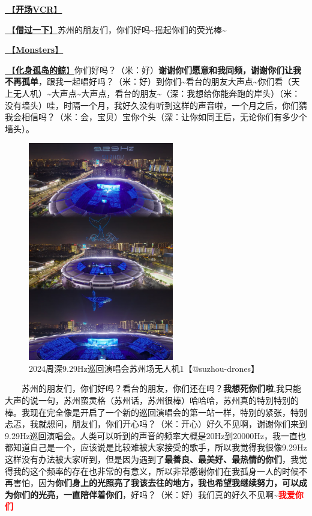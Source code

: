 \documentclass[]{ctexbook}
\begin{document}
\hyperref[opening-vcr]{🎥【\textbf{开场VCR}】}

\hyperref[I-will-go-my-way]{🎵【\textbf{借过一下}】}苏州的朋友们，你们好吗\textasciitilde 摇起你们的荧光棒\textasciitilde{}

\hyperref[Monsters]{🎵【\textbf{Monsters}】}

\hyperref[hua-shen-gu-dao-de-jing]{🎵【\textbf{化身孤岛的鲸}】}你们好吗？（米：好）\textbf{谢谢你们愿意和我同频，谢谢你们让我不再孤单}，跟我一起唱好吗？（米：好）到你们\textasciitilde 看台的朋友大声点\textasciitilde 你们看（天上无人机）\textasciitilde 大声点\textasciitilde 大声点，看台的朋友\textasciitilde（深：我想给你能奔跑的岸头）（米：没有墙头）哇，时隔一个月，我好久没有听到这样的声音啦，一个月之后，你们猜我会相信吗？（米：会，宝贝）宝你个头（深：让你如同王后，无论你们有多少个墙头）。

\begin{figure}

{\centering \includegraphics[width=180pt]{img/suzhou20241109/001} 

}

\caption{2024周深9.29Hz巡回演唱会苏州场无人机1【@suzhou-drones】}\label{fig:unnamed-chunk-114}
\end{figure}

  苏州的朋友们，你们好吗？看台的朋友，你们还在吗？\textbf{我想死你们啦},我只能大声的说一句，苏州蛮灵格（苏州话，苏州很棒）哈哈哈，苏州真的特别特别的棒。我现在完全像是开启了一个新的巡回演唱会的第一站一样，特别的紧张，特别忐忑，我就想问，朋友们，你们开心吗？（米：开心）好久不见啊，谢谢你们来到9.29Hz巡回演唱会。人类可以听到的声音的频率大概是20Hz到20000Hz，我一直也都知道自己是一个，应该说是比较难被大家接受的歌手，所以我觉得我很像9.29Hz这样没有办法被大家听到，但是因为遇到了\textbf{最善良、最美好、最热情的你们}，我觉得我的这个频率的存在也非常的有意义，所以非常感谢你们在我孤身一人的时候不再害怕，因为\textbf{你们身上的光照亮了我该去往的地方，我也希望我继续努力，可以成为你们的光亮，一直陪伴着你们}，好吗？（米：好）我们真的好久不见啊\textasciitilde{}\textbf{\textcolor{red}{我爱你们~} }
\end{document}
